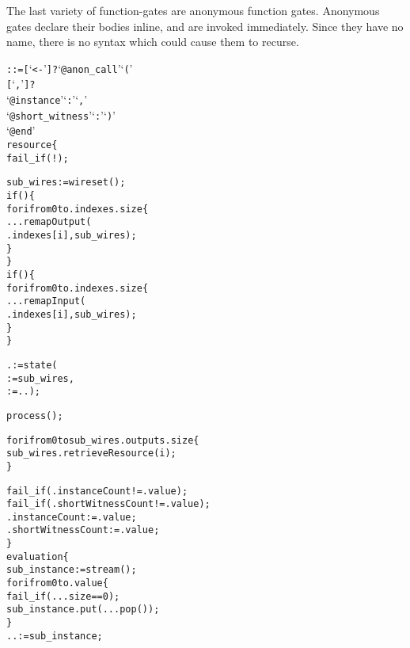 The last variety of function-gates are anonymous function gates.
Anonymous gates declare their bodies inline, and are invoked immediately.
Since they have no name, there is no syntax which could cause them to recurse.\\

\begin{alltt}\ttSyn
   ::= [  `<-' ]? `@anon_call' `('
                    [   `,' ]?
                    `@instance' `:'  `,'
                    `@short\_witness' `:'  `)'
                    `@end'\ttSem
  resource \{
    fail_if(!);

    sub_wires := wireset();
    if() \{
      for i from 0 to .indexes.size \{
        ...remapOutput(
          .indexes[i], sub_wires);
      \}
    \}
    if() \{
      for i from 0 to .indexes.size \{
        ...remapInput(
          .indexes[i], sub_wires);
      \}
    \}

    . := state(
       := sub_wires,
       := ..);

    process();

    for i from 0 to sub_wires.outputs.size \{
      sub_wires.retrieveResource(i);
    \}

    fail_if(.instanceCount != .value);
    fail_if(.shortWitnessCount != .value);
    .instanceCount := .value;
    .shortWitnessCount := .value;
  \}
  evaluation \{
    sub_instance := stream();
    for i from 0 to .value \{
      fail_if(...size == 0);
      sub_instance.put(...pop());
    \}
    .. := sub_instance;


\end{alltt}
